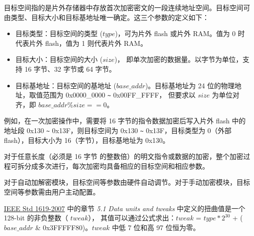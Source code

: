 \documentclass[main\_\_CN.tex]{subfiles}
\begin{document}
目标空间指的是片外存储器中存放首次加密密文的一段连续地址空间。目标空间可由类型、目标大小和目标基地址唯一确定。这三个参数的定义如下：

\begin{itemize}
    \item 目标类型：目标空间的类型 (\begin{math} type \end{math})，可为片外 flash 或片外 RAM。值为 0 时代表片外 flash，值为 1 则代表片外 RAM。
    \item 目标大小：目标空间的大小 (\begin{math} size \end{math})， 即单次加密的数据量。以字节为单位，支持 16 字节、32 字节或 64 字节。
    \item 目标基地址：目标空间的基地址 (\begin{math} base\_addr\end{math})。目标基地址为 24 位的物理地址，取值范围为 0x0000\_0000 \verb+~+ 0x00FF\_FFFF， 但要求以 \begin{math} size \end{math} 为单位对齐，即 \begin{math} base\_addr \% size == 0 \end{math}。
\end{itemize}

例如，在一次加密操作中，需要将 16 字节的指令数据加密后写入片外 flash 中的地址段 0x130 \verb+~+ 0x13F，则目标空间为 0x130 \verb+~+ 0x13F，目标类型为 0（外部 flash），目标大小为 16（字节），目标基地址为 0x130。

对于任意长度（必须是 16 字节 的整数倍）的明文指令或数据的加密，整个加密过程可拆分成多次进行，每次加密均具备相应的目标空间和相应参数。

对于自动加解密模块，目标空间等参数由硬件自动调节。对于手动加密模块，目标空间等参数需由用户主动配置。

\begin{tiplisting}
\vspace{-2em}
\begin{enumerate}
    \href{https://ieeexplore.ieee.org/document/4493450}{IEEE Std 1619-2007} 中的章节 \textit{5.1 Data units and tweaks} 中定义的扭曲值是一个 128-bit 的非负整数（ \begin{math} tweak \end{math}），
    其值可以通过公式求出：\begin{math} tweak \end{math} = \begin{math} type * 2^{30}\end{math} + (\begin{math} base\_addr \end{math} \& 0x3FFFFF80)。\begin{math} tweak \end{math} 中低 7 位和高 97 位恒为零。
\end{enumerate}
\end{tiplisting}
\end{document}
